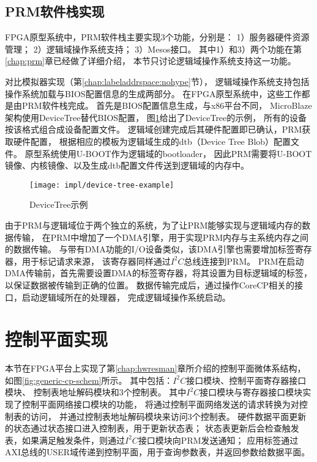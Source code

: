 

\subsection{PRM软件栈实现}

FPGA原型系统中，PRM软件栈主要实现3个功能，分别是：
1）服务器硬件资源管理；
2）逻辑域操作系统支持；
3）Mesos接口。
其中1）和3）两个功能在第\ref{chap:prm}章已经做了详细介绍，
本节只讨论逻辑域操作系统支持这一功能。

对比模拟器实现（第\ref{chap:labeladdrspace:nohype}节），
逻辑域操作系统支持包括操作系统加载与BIOS配置信息的生成两部分。
在FPGA原型系统中，这些工作都是由PRM软件栈完成。
首先是BIOS配置信息生成，与x86平台不同，
MicroBlaze架构使用DeviceTree\cite{device-tree}替代BIOS配置，
图\ref{fig:device-tree-example}给出了DeviceTree的示例，
所有的设备按该格式组合成设备配置文件。
逻辑域创建完成后其硬件配置即已确认，PRM获取硬件配置，
根据相应的模板为逻辑域生成的dtb（Device Tree Blob）配置文件。
原型系统使用U-BOOT\cite{u-boot}作为逻辑域的bootloader，
因此PRM需要将U-BOOT镜像、内核镜像、以及生成dtb配置文件传送到逻辑域的内存中。

\begin{figure}[htb]
  \centering
  \texttt{[image: impl/device-tree-example]}
  \caption{DeviceTree示例}
  \label{fig:device-tree-example}
\end{figure}

由于PRM与逻辑域位于两个独立的系统，为了让PRM能够实现与逻辑域内存的数据传输，
在PRM中增加了一个DMA引擎，用于实现PRM内存与主系统内存之间的数据传输。
与带有DMA功能的I/O设备类似，该DMA引擎也需要增加标签寄存器，用于标记请求来源，
该寄存器同样通过$I^2C$总线连接到PRM。
PRM在启动DMA传输前，首先需要设置DMA的标签寄存器，将其设置为目标逻辑域的标签，
以保证数据被传输到正确的位置。
数据传输完成后，通过操作CoreCP相关的接口，启动逻辑域所在的处理器，
完成逻辑域操作系统启动。


\section{控制平面实现}
\label{chap:impl:cp}

本节在FPGA平台上实现了第\ref{chap:hwresman}章所介绍的控制平面微体系结构，
如图\ref{fig:generic-cp-schem}所示。
其中包括：$I^2C$接口模块、控制平面寄存器接口模块、
控制表地址解码模块和3个控制表。
其中$I^2C$接口模块与寄存器接口模块实现了控制平面网络接口模块的功能，
将通过控制平面网络发送的请求转换为对控制表的访问，
并通过控制表地址解码模块来访问3个控制表。
硬件数据平面更新的状态通过状态接口进入控制表，用于更新状态表；
状态表更新后会检查触发表，如果满足触发条件，则通过$I^2C$接口模块向PRM发送通知；
应用标签通过AXI总线的USER域传递到控制平面，用于查询参数表，并返回参数给数据平面。

